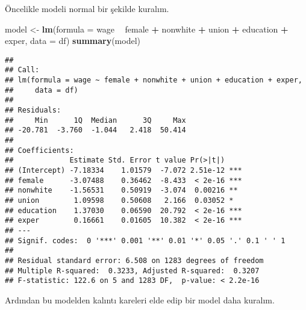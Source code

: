 \documentclass[
]{book}
\newenvironment{Shaded}{\begin{snugshade}}{\end{snugshade}}
\newcommand{\DataTypeTok}[1]{\textcolor[rgb]{0.13,0.29,0.53}{#1}}
\newcommand{\DecValTok}[1]{\textcolor[rgb]{0.00,0.00,0.81}{#1}}
\newcommand{\KeywordTok}[1]{\textcolor[rgb]{0.13,0.29,0.53}{\textbf{#1}}}
\newcommand{\NormalTok}[1]{#1}
\newcommand{\OperatorTok}[1]{\textcolor[rgb]{0.81,0.36,0.00}{\textbf{#1}}}
\newcommand{\StringTok}[1]{\textcolor[rgb]{0.31,0.60,0.02}{#1}}
\begin{document}
Öncelikle modeli normal bir şekilde kuralım.

\begin{Shaded}
\begin{Highlighting}[]
\NormalTok{model <-}\StringTok{ }\KeywordTok{lm}\NormalTok{(}\DataTypeTok{formula =}\NormalTok{ wage }\OperatorTok{~}\StringTok{ }\NormalTok{female }\OperatorTok{+}\StringTok{ }\NormalTok{nonwhite }\OperatorTok{+}\StringTok{ }\NormalTok{union }\OperatorTok{+}\StringTok{ }\NormalTok{education }\OperatorTok{+}\StringTok{ }\NormalTok{exper, }\DataTypeTok{data =}\NormalTok{ df)}
\KeywordTok{summary}\NormalTok{(model)}
\end{Highlighting}
\end{Shaded}

\begin{verbatim}
## 
## Call:
## lm(formula = wage ~ female + nonwhite + union + education + exper, 
##     data = df)
## 
## Residuals:
##     Min      1Q  Median      3Q     Max 
## -20.781  -3.760  -1.044   2.418  50.414 
## 
## Coefficients:
##             Estimate Std. Error t value Pr(>|t|)    
## (Intercept) -7.18334    1.01579  -7.072 2.51e-12 ***
## female      -3.07488    0.36462  -8.433  < 2e-16 ***
## nonwhite    -1.56531    0.50919  -3.074  0.00216 ** 
## union        1.09598    0.50608   2.166  0.03052 *  
## education    1.37030    0.06590  20.792  < 2e-16 ***
## exper        0.16661    0.01605  10.382  < 2e-16 ***
## ---
## Signif. codes:  0 '***' 0.001 '**' 0.01 '*' 0.05 '.' 0.1 ' ' 1
## 
## Residual standard error: 6.508 on 1283 degrees of freedom
## Multiple R-squared:  0.3233, Adjusted R-squared:  0.3207 
## F-statistic: 122.6 on 5 and 1283 DF,  p-value: < 2.2e-16
\end{verbatim}

Ardından bu modelden kalıntı kareleri elde edip bir model daha kuralım.

\begin{Shaded}
\end{Shaded}
\end{document}

